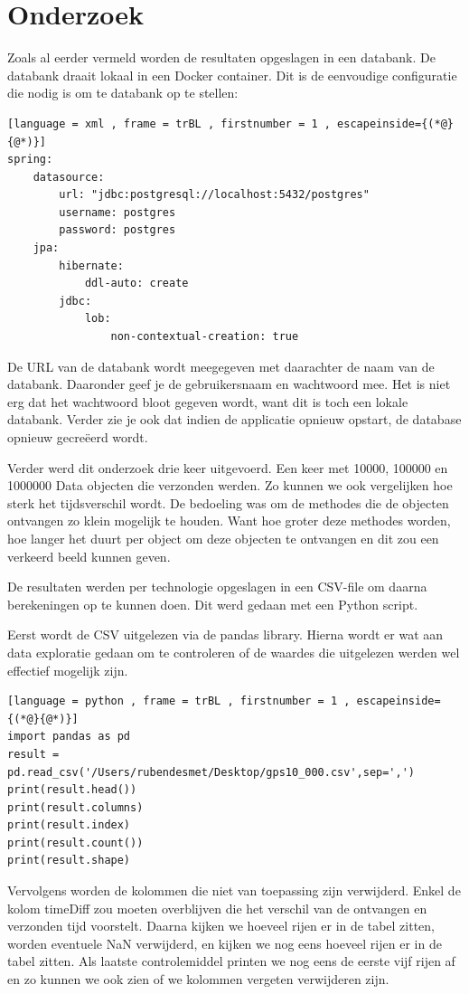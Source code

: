 \section{Onderzoek}
Zoals al eerder vermeld worden de resultaten opgeslagen in een databank. De databank draait lokaal in een Docker container. Dit is de eenvoudige configuratie die nodig is om te databank op te stellen:
\begin{lstlisting}[language = xml , frame = trBL , firstnumber = 1 , escapeinside={(*@}{@*)}]
spring:
    datasource:
        url: "jdbc:postgresql://localhost:5432/postgres"
        username: postgres
        password: postgres
    jpa:
        hibernate:
            ddl-auto: create
        jdbc:
            lob:
                non-contextual-creation: true
\end{lstlisting}
De URL van de databank wordt meegegeven met daarachter de naam van de databank. Daaronder geef je de gebruikersnaam en wachtwoord mee. Het is niet erg dat het wachtwoord bloot gegeven wordt, want dit is toch een lokale databank. Verder zie je ook dat indien de applicatie opnieuw opstart, de database opnieuw gecreëerd wordt.

Verder werd dit onderzoek drie keer uitgevoerd. Een keer met 10000, 100000 en 1000000 Data objecten die verzonden werden. Zo kunnen we ook vergelijken hoe sterk het tijdsverschil wordt. De bedoeling was om de methodes die de objecten ontvangen zo klein mogelijk te houden. Want hoe groter deze methodes worden, hoe langer het duurt per object om deze objecten te ontvangen en dit zou een verkeerd beeld kunnen geven.

De resultaten werden per technologie opgeslagen in een CSV-file om daarna berekeningen op te kunnen doen. Dit werd gedaan met een Python script. 

Eerst wordt de CSV uitgelezen via de pandas library. Hierna wordt er wat aan data exploratie gedaan om te controleren of de waardes die uitgelezen werden wel effectief mogelijk zijn. 
\begin{lstlisting}[language = python , frame = trBL , firstnumber = 1 , escapeinside={(*@}{@*)}]
import pandas as pd
result = pd.read_csv('/Users/rubendesmet/Desktop/gps10_000.csv',sep=',')
print(result.head())
print(result.columns)
print(result.index)
print(result.count())
print(result.shape)
\end{lstlisting}

Vervolgens worden de kolommen die niet van toepassing zijn verwijderd. Enkel de kolom timeDiff zou moeten overblijven die het verschil van de ontvangen en verzonden tijd voorstelt. Daarna kijken we hoeveel rijen er in de tabel zitten, worden eventuele NaN verwijderd, en kijken we nog eens hoeveel rijen er in de tabel zitten. Als laatste controlemiddel printen we nog eens de eerste vijf rijen af en zo kunnen we ook zien of we kolommen vergeten verwijderen zijn. 

